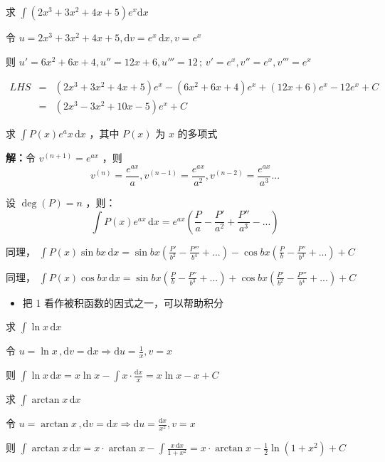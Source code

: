 \begin{example}{}
求 $\displaystyle{\int\left(2x^3+3x^2+4x+5\right)e^x\mathrm {d}x}$ 

令 $\displaystyle{u=2x^3+3x^2+4x+5,\mathrm{d}v=e^x\,\mathrm{d}x,v=e^x}$

则 $\displaystyle{u'=6x^2+6x+4,u''=12x+6,u'''=12\,;\,v'=e^x,v''=e^x,v'''=e^x}$ 

$\begin{eqnarray*} LHS&=&(2x^3+3x^2+4x+5)e^x-(6x^2+6x+4)e^x+(12x+6)e^x-12e^x+C \\&=&(2x^3-3x^2+10x-5)e^x+C \end{eqnarray*}$ 
\end{example}
\begin{corollary}{}
求 $\displaystyle{\int P(x)e^ax\,\mathrm{d}x}$ ，其中 $P(x)$ 为 $x$ 的多项式

\textbf{解：}令 $v^{(n+1)}=e^{ax}$ ，则
$$v^{(n)}=\frac{e^{ax}}{a},v^{(n-1)}=\frac{e^{ax}}{a^2},v^{(n-2)}=\frac{e^{ax}}{a^3}...$$ 

设 $\deg (P)=n$ ，则：
$$\int P(x)e^{ax}\,\mathrm{d}x=e^{ax}\left(\frac{P}{a}-\frac{P'}{a^2}+\frac{P''}{a^3}-...\right)$$

同理， $\displaystyle{\int P(x)\sin bx\,\mathrm{d}x=\sin bx\left(\frac{P'}{b^2}-\frac{P'''}{b^4}+...\right)-\cos bx\left(\frac{P}{b}-\frac{P''}{b^3}+...\right)+C}$

同理， $\displaystyle{\int P(x)\cos bx\,\mathrm{d}x=\sin bx\left(\frac{P}{b}-\frac{P''}{b^3}+...\right)+\cos bx\left(\frac{P'}{b^2}-\frac{P'''}{b^4}+...\right)+C}$
\end{corollary}
\begin{itemize}
\item 把 1 看作被积函数的因式之一，可以帮助积分
\end{itemize}
\begin{corollary}{}
求 $\displaystyle{\int \ln x\,\mathrm{d}x}$

令 $\displaystyle{u=\ln x\,,\mathrm{d}v=\mathrm{d}x\Rightarrow \mathrm{d}u=\frac{1}{x},v=x}$ 

则 $\displaystyle{\int \ln x\,\mathrm{d}x=x\ln x-\int x\cdot\frac{\mathrm{d}x}x=x\ln x-x+C}$
\end{corollary}
\begin{corollary}{}
求 $\displaystyle{\int\arctan x\,\mathrm{d}x}$

令 $\displaystyle{u=\arctan x\,,\mathrm{d}v=\mathrm{d}x\Rightarrow \mathrm{d}u=\frac{\mathrm{d}x}{x^2},v=x}$

则 $\displaystyle{\int\arctan x\,\mathrm{d}x=x\cdot \arctan x-\int\frac{x\,\mathrm{d}x}{1+x^2}=x\cdot \arctan x-\frac{1}{2}\ln\left(1+x^2\right)+C}$ 
\end{corollary}
